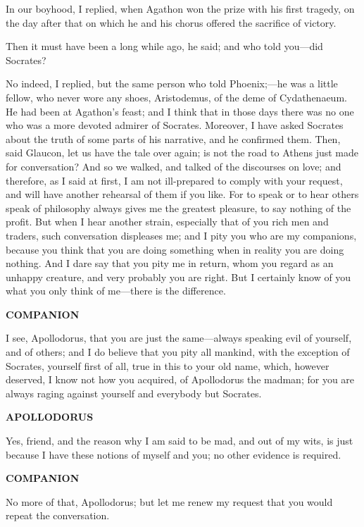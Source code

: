 \documentclass[11pt,letter]{article}
\begin{document}
\par  In our boyhood, I replied, when Agathon won the prize with his first tragedy, on the day after that on which he and his chorus offered the sacrifice of victory.

\par  Then it must have been a long while ago, he said; and who told you—did Socrates?

\par  No indeed, I replied, but the same person who told Phoenix;—he was a little fellow, who never wore any shoes, Aristodemus, of the deme of Cydathenaeum. He had been at Agathon's feast; and I think that in those days there was no one who was a more devoted admirer of Socrates. Moreover, I have asked Socrates about the truth of some parts of his narrative, and he confirmed them. Then, said Glaucon, let us have the tale over again; is not the road to Athens just made for conversation? And so we walked, and talked of the discourses on love; and therefore, as I said at first, I am not ill-prepared to comply with your request, and will have another rehearsal of them if you like. For to speak or to hear others speak of philosophy always gives me the greatest pleasure, to say nothing of the profit. But when I hear another strain, especially that of you rich men and traders, such conversation displeases me; and I pity you who are my companions, because you think that you are doing something when in reality you are doing nothing. And I dare say that you pity me in return, whom you regard as an unhappy creature, and very probably you are right. But I certainly know of you what you only think of me—there is the difference.

\par \textbf{COMPANION}
\par   I see, Apollodorus, that you are just the same—always speaking evil of yourself, and of others; and I do believe that you pity all mankind, with the exception of Socrates, yourself first of all, true in this to your old name, which, however deserved, I know not how you acquired, of Apollodorus the madman; for you are always raging against yourself and everybody but Socrates.

\par \textbf{APOLLODORUS}
\par   Yes, friend, and the reason why I am said to be mad, and out of my wits, is just because I have these notions of myself and you; no other evidence is required.

\par \textbf{COMPANION}
\par   No more of that, Apollodorus; but let me renew my request that you would repeat the conversation.
\end{document}
